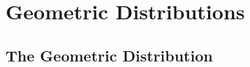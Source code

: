 \documentclass[../maths.tex]{subfiles}
\begin{document}
\chapter{Geometric Distributions}
\section{The Geometric Distribution}
\end{document}
